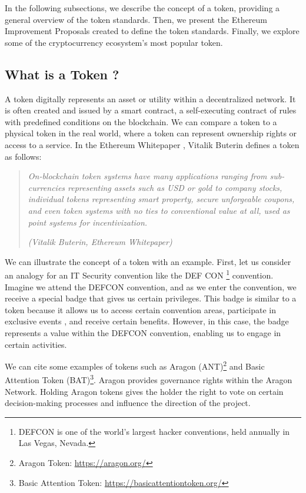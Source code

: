 In the following subsections, we describe the concept of a token, providing a general overview of the token standards. Then, we present
the Ethereum Improvement Proposals created to define the token standards. Finally, we explore some of the cryptocurrency ecosystem's most popular
token.



\subsection{What is a Token ?}

A token digitally represents an asset or utility within a decentralized network. It is often created and issued by
a smart contract, a self-executing contract of rules with predefined conditions on the blockchain. We can compare a token
to a physical token in the real world, where a token can represent ownership rights or access to a service. In the Ethereum Whitepaper
\cite{ethereum_white_paper}, Vitalik Buterin defines a token as follows:

\begin{quote}
   \textit{On-blockchain token systems have many applications ranging from sub-currencies representing assets such as USD or gold to
       company stocks, individual tokens representing smart property, secure unforgeable coupons, and even token systems with no ties to
       conventional value at all, used as point systems for incentivization.}


   \textit{(Vitalik Buterin, Ethereum Whitepaper)}
\end{quote}


We can illustrate the concept of a token with an example. First, let us consider an analogy for an IT Security convention like the DEF CON
\footnote{DEFCON is one of the world's largest hacker conventions, held annually in Las Vegas, Nevada.} convention. Imagine we attend
the DEFCON convention, and as we enter the convention, we receive a special badge that gives us certain privileges. This badge
is similar to a token because it allows us to access certain convention areas, participate in exclusive events
, and receive certain benefits. However, in this case, the badge represents a value within the DEFCON convention, enabling us to engage
in certain activities.

We can cite some examples of tokens such as Aragon (ANT)\footnote{Aragon Token: \url{https://aragon.org/}} and Basic Attention Token (BAT)\footnote{Basic Attention Token: \url{https://basicattentiontoken.org/}}.
Aragon provides governance rights within the Aragon Network. Holding Aragon tokens gives the holder the right to vote on certain
decision-making processes and influence the direction of the project.

